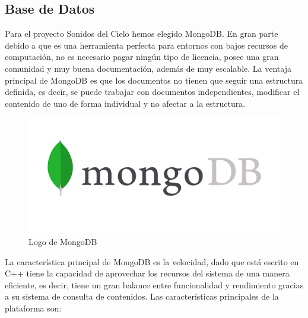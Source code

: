 \subsection{Base de Datos}
Para el proyecto Sonidos del Cielo hemos elegido MongoDB. En gran parte debido a que es una herramienta perfecta para entornos con bajos recursos de computación, no es necesario pagar ningún tipo de licencia, posee una gran comunidad y muy buena documentación, además de muy escalable. La ventaja principal de MongoDB es que los documentos no tienen que seguir una estructura definida, es decir, se puede trabajar con documentos independientes, modificar el contenido de uno de forma individual y no afectar a la estructura.

\begin{figure}[h]
    \centering
    \includegraphics[scale=0.2]{include/figuras/mongo.png}
    \caption{Logo de MongoDB}
    \label{fig:mongo}
\end{figure}

La característica principal de MongoDB es la velocidad, dado que está escrito en C++ tiene la capacidad de aprovechar los recursos del sistema de una manera eficiente, es decir, tiene un gran balance entre funcionalidad y rendimiento gracias a su sistema de consulta de contenidos. Las características principales de la plataforma son:

